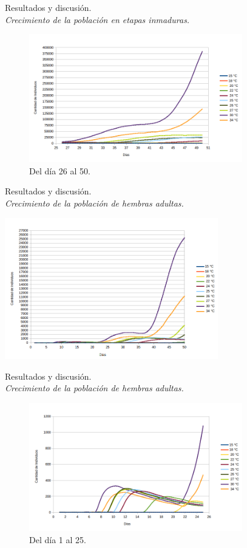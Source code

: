 \begin{frame}[t]{Resultados y discusión.\\\textit{Crecimiento de la población en etapas inmaduras.}}
\begin{center}
\begin{figure}
    \includegraphics[width=9.3cm]{./graphics/poblacion-inmadura-p2.png}
    \caption{Del día 26 al 50.}
\end{figure}
\end{center}
\end{frame}

\begin{frame}[t]{Resultados y discusión.\\\textit{Crecimiento de la población de hembras adultas.}}
\begin{center}
    \includegraphics[width=9.3cm]{../paper/graphics/evolucion-poblacion-adultos.png}
\end{center}
\end{frame}

\begin{frame}[t]{Resultados y discusión.\\\textit{Crecimiento de la población de hembras adultas.}}
\begin{center}
\begin{figure}
    \includegraphics[width=9.3cm]{./graphics/poblacion-adulto-p1.png}
    \caption{Del día 1 al 25.}
\end{figure}
\end{center}
\end{frame}

